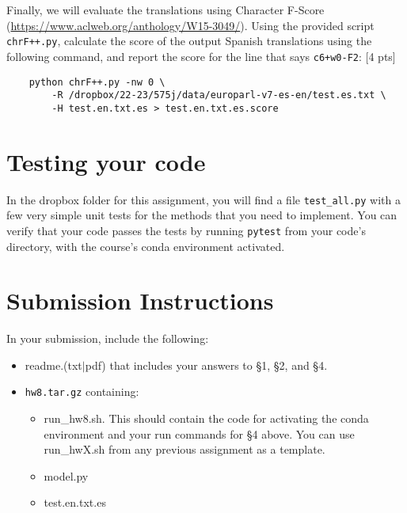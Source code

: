 \documentclass[11pt]{article}
\begin{document}
\vspace{2em}
 Finally, we will evaluate the translations using Character F-Score (\url{https://www.aclweb.org/anthology/W15-3049/}). Using the provided script \texttt{chrF++.py}, calculate the score of the output Spanish translations using the following command, and report the score for the line that says \texttt{c6+w0-F2}: \hfill [4 pts]
\begin{lstlisting}
    python chrF++.py -nw 0 \ 
        -R /dropbox/22-23/575j/data/europarl-v7-es-en/test.es.txt \
        -H test.en.txt.es > test.en.txt.es.score
\end{lstlisting}

\section{Testing your code}

In the dropbox folder for this assignment, you will find a file \texttt{test\_all.py} with a few very simple unit tests for the methods that you need to implement.  You can verify that your code passes the tests by running \texttt{pytest} from your code's directory, with the course's conda environment activated.


\section*{Submission Instructions}

In your submission, include the following:
\begin{itemize}
  \item readme.(txt$\mid$pdf) that includes your answers to \S1, \S2, and \S4. 
  \item \texttt{hw8.tar.gz} containing:
  \begin{itemize}
    \item run\_hw8.sh.  This should contain the code for activating the conda environment and your run commands for \S4 above.  You can use run\_hwX.sh from any previous assignment as a template.
    \item model.py
    \item test.en.txt.es
    \end{itemize}
\end{itemize}
\end{document}

